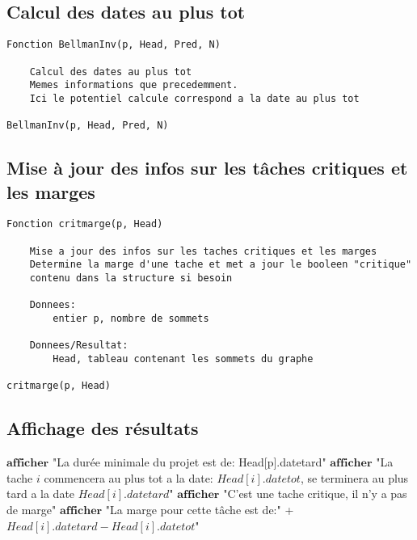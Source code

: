 \documentclass{article}
\begin{document}
\subsection{Calcul des dates au plus tot}

\begin{lstlisting}
Fonction BellmanInv(p, Head, Pred, N)

	Calcul des dates au plus tot
	Memes informations que precedemment. 
	Ici le potentiel calcule correspond a la date au plus tot

BellmanInv(p, Head, Pred, N)
\end{lstlisting}

\subsection{Mise à jour des infos sur les tâches critiques et les marges}

\begin{lstlisting}
Fonction critmarge(p, Head)

	Mise a jour des infos sur les taches critiques et les marges
	Determine la marge d'une tache et met a jour le booleen "critique" 
	contenu dans la structure si besoin

	Donnees:
		entier p, nombre de sommets
		
	Donnees/Resultat:
		Head, tableau contenant les sommets du graphe

critmarge(p, Head)

\end{lstlisting}

\subsection{Affichage des résultats}

\begin{algorithmic}[3]


\STATE $\textbf{afficher}$ "La durée minimale du projet est de: Head[p].datetard"
	\STATE $\textbf{afficher}$ "La tache $i$ commencera au plus tot a la date: $Head[i].datetot$, se terminera au plus tard a la date $Head[i].datetard$"
		\STATE $\textbf{afficher}$ "C'est une tache critique, il n'y a pas de marge"
	\ELSE
		\STATE $\textbf{afficher}$ "La marge pour cette tâche est de:" + $Head[i].datetard-Head[i].datetot$"
	\ENDIF

\ENDFOR
\end{algorithmic}
\end{document}

